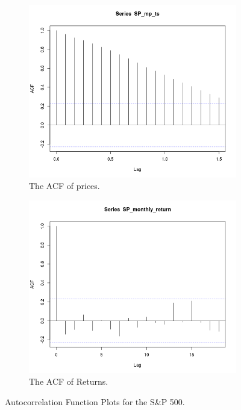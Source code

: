 \documentclass[10pt]{article_simple}
\begin{document}
\begin{figure}[H]
\centering
	\begin{subfigure}{.45\textwidth}
  	\centering
  	\includegraphics[width=.95\linewidth]{ACF_pr.png}
  	\caption{The ACF of prices.}
	\end{subfigure}%
	\hspace{1em}
	\begin{subfigure}{.45\textwidth}
  	\centering
  	\includegraphics[width=.95\linewidth]{ACF_re.png}
  	\caption{The ACF of Returns.}
	\end{subfigure}
\caption{Autocorrelation Function Plots for the S\&P 500.}
\end{figure}
\end{document}
